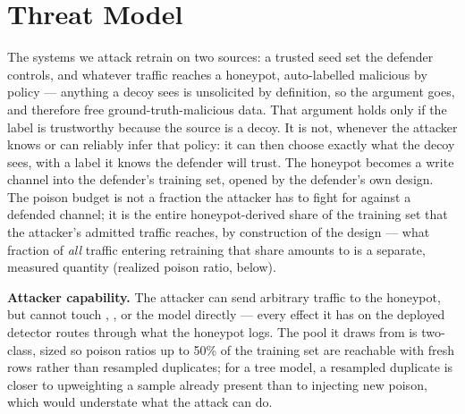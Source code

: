 \section{Threat Model}
\label{sec:threat-model}
The systems we attack retrain on two sources: a trusted seed set the defender controls, and
whatever traffic reaches a honeypot, auto-labelled malicious by policy — anything a decoy sees is
unsolicited by definition, so the argument goes, and therefore free ground-truth-malicious data.
That argument holds only if the label is trustworthy because the source is a decoy. It is not,
whenever the attacker knows or can reliably infer that policy: it can then choose exactly what
the decoy sees, with a label it knows the defender will trust. The honeypot becomes a write
channel into the defender's training set, opened by the defender's own design. The poison budget
is not a fraction the attacker has to fight for against a defended channel; it is the entire
honeypot-derived share of the training set that the attacker's admitted traffic reaches, by
construction of the design — what fraction of \emph{all} traffic entering retraining that share
amounts to is a separate, measured quantity (realized poison ratio, below).

\textbf{Attacker capability.} The attacker can send arbitrary traffic to the honeypot, but cannot
touch , , or the model directly — every effect it has
on the deployed detector routes through what the honeypot logs. The pool it draws from is
two-class, sized so poison ratios up to 50\% of the training set are reachable with fresh rows
rather than resampled duplicates; for a tree model, a resampled duplicate is closer to
upweighting a sample already present than to injecting new poison, which would understate what
the attack can do.

